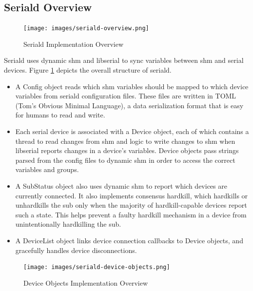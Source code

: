 \documentclass[11pt]{article}
\begin{document}
\subsection{Seriald Overview}

\begin{figure}
    \centering
    \texttt{[image: images/seriald-overview.png]}
    \caption{Seriald Implementation Overview}
    \label{fig:overview}
\end{figure}

Seriald uses dynamic shm and libserial to sync variables between shm and serial devices. Figure \ref{fig:overview} depicts the overall structure of seriald.

\begin{itemize}

\item A Config object reads which shm variables should be mapped to which device variables from seriald configuration files. These files are written in TOML (Tom's Obvious Minimal Language), a data serialization format that is easy for humans to read and write.

\item Each serial device is associated with a Device object, each of which contains a thread to read changes from shm and logic to write changes to shm when libserial reports changes in a device's variables. Device objects pass strings parsed from the config files to dynamic shm in order to access the correct variables and groups.

\item A SubStatus object also uses dynamic shm to report which devices are currently connected. It also implements consensus hardkill, which hardkills or unhardkills the sub only when the majority of hardkill-capable devices report such a state. This helps prevent a faulty hardkill mechanism in a device from unintentionally hardkilling the sub.

\item A DeviceList object links device connection callbacks to Device objects, and gracefully handles device disconnections.

\end{itemize}

\begin{figure}
    \centering
    \texttt{[image: images/seriald-device-objects.png]}
    \caption{Device Objects Implementation Overview}
    \label{fig:device-objects}
\end{figure}
\end{document}
